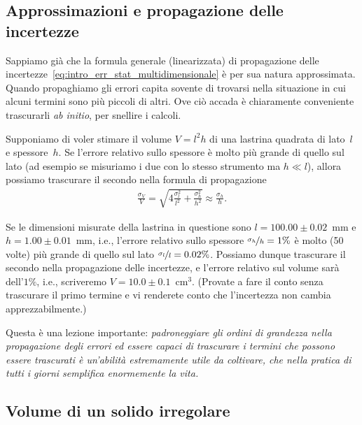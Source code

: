 \subsection{Approssimazioni e propagazione delle incertezze}

Sappiamo già che la formula generale (linearizzata) di propagazione delle
incertezze~\eqref{eq:intro_err_stat_multidimensionale} è per sua natura
approssimata. Quando propaghiamo gli errori capita sovente di trovarsi nella
situazione in cui alcuni termini sono più piccoli di altri. Ove ciò accada
è chiaramente conveniente trascurarli \emph{ab initio}, per snellire i
calcoli.

Supponiamo di voler stimare il volume $V = l^2h$ di una lastrina quadrata di
lato~$l$ e spessore~$h$. Se l'errore relativo sullo spessore è molto più
grande di quello sul lato (ad esempio se misuriamo i due con lo stesso strumento
ma $h \ll l$), allora possiamo trascurare il secondo nella formula di
propagazione
\begin{align*}
  \frac{\sigma_V}{V} =
  \sqrt{4\frac{\sigma^2_l}{l^2} + \frac{\sigma^2_h}{h^2}} \approx
  \frac{\sigma_h}{h}.
\end{align*}

\begin{examplebox}
  \begin{example}
    Se le dimensioni misurate della lastrina in questione sono
    $l = 100.00 \pm 0.02$~mm e $h = 1.00 \pm 0.01$~mm, i.e., l'errore relativo
    sullo spessore $\nicefrac{\sigma_h}{h} = 1\%$ è molto (50 volte) più
    grande di quello sul lato $\nicefrac{\sigma_l}{l} = 0.02\%$. Possiamo
    dunque trascurare il secondo nella propagazione delle incertezze, e
    l'errore relativo sul volume sarà dell'$1\%$, i.e., scriveremo
    $V = 10.0 \pm 0.1$~cm$^3$. (Provate a fare il conto senza trascurare il
    primo termine e vi renderete conto che l'incertezza non cambia
    apprezzabilmente.)
  \end{example}
\end{examplebox}

Questa è una lezione importante:
\emph{padroneggiare gli ordini di grandezza nella propagazione degli errori
  ed essere capaci di trascurare i termini che possono essere trascurati
  è un'abilità estremamente utile da coltivare, che nella pratica di
  tutti i giorni semplifica enormemente la vita.}


\subsection{Volume di un solido irregolare}

